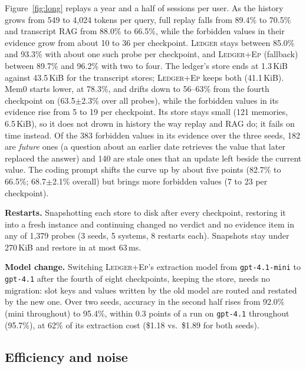 \documentclass[10pt,conference]{IEEEtran}
\newcommand{\sys}{\textsc{Ledger}}
\newcommand{\hyb}{\textsc{Ledger+Ep}}
\begin{document}
Figure~\ref{fig:long} replays a year and a half of sessions per user. As the
history grows from 549 to 4{,}024 tokens per query, full replay falls from 89.4\%
to 70.5\% and transcript RAG from 88.0\% to 66.5\%, while the forbidden values in
their evidence grow from about 10 to 36 per checkpoint. \sys{} stays between
85.0\% and 93.3\% with about one such probe per checkpoint, and \hyb{}
(fallback) between 89.7\% and 96.2\% with two to four. The ledger's store ends at 1.3\,KiB against 43.5\,KiB for
the transcript stores; \hyb{} keeps both (41.1\,KiB).
Mem0 starts lower, at 78.3\%, and drifts down to 56--63\% from the fourth
checkpoint on (63.5$\pm$2.3\% over all probes), while the forbidden values in its
evidence rise from 5 to 19 per checkpoint. Its store stays small (121 memories,
6.5\,KiB), so it does not drown in history the way replay and RAG do; it fails
on time instead. Of the 383 forbidden values in its evidence over the three
seeds, 182 are \emph{future} ones (a
question about an earlier date retrieves the value that later replaced the
answer) and 140 are stale ones that an update left beside the current value. The coding prompt shifts the curve up by about five points
(82.7\% to 66.5\%; 68.7$\pm$2.1\% overall) but brings more forbidden values
(7 to 23 per checkpoint).

\textbf{Restarts.} Snapshotting each store to disk after every checkpoint,
restoring it into a fresh instance and continuing changed no verdict and no
evidence item in any of 1{,}379 probes (3 seeds, 5 systems, 8 restarts each).
Snapshots stay under 270\,KiB and restore in at most 63\,ms.

\textbf{Model change.} Switching \hyb{}'s extraction model from
\texttt{gpt-4.1-mini} to \texttt{gpt-4.1} after the fourth of eight
checkpoints, keeping the store, needs no migration: slot keys and values
written by the old model are routed and restated by the new one. Over two
seeds, accuracy in the second half rises from 92.0\% (mini throughout) to
95.4\%, within 0.3 points of a run on \texttt{gpt-4.1} throughout (95.7\%),
at 62\% of its extraction cost (\$1.18 vs.\ \$1.89 for both seeds).

\subsection{Efficiency and noise}
\end{document}
